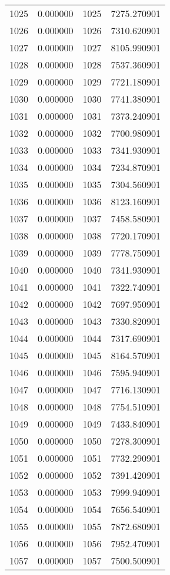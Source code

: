 \documentclass[12pt]{article}
\begin{document}
\begin{longtable}{@{}cccc@{}}
1025 & 0.000000 & 1025 & 7275.270901 \\
1026 & 0.000000 & 1026 & 7310.620901 \\
1027 & 0.000000 & 1027 & 8105.990901 \\
1028 & 0.000000 & 1028 & 7537.360901 \\
1029 & 0.000000 & 1029 & 7721.180901 \\
1030 & 0.000000 & 1030 & 7741.380901 \\
1031 & 0.000000 & 1031 & 7373.240901 \\
1032 & 0.000000 & 1032 & 7700.980901 \\
1033 & 0.000000 & 1033 & 7341.930901 \\
1034 & 0.000000 & 1034 & 7234.870901 \\
1035 & 0.000000 & 1035 & 7304.560901 \\
1036 & 0.000000 & 1036 & 8123.160901 \\
1037 & 0.000000 & 1037 & 7458.580901 \\
1038 & 0.000000 & 1038 & 7720.170901 \\
1039 & 0.000000 & 1039 & 7778.750901 \\
1040 & 0.000000 & 1040 & 7341.930901 \\
1041 & 0.000000 & 1041 & 7322.740901 \\
1042 & 0.000000 & 1042 & 7697.950901 \\
1043 & 0.000000 & 1043 & 7330.820901 \\
1044 & 0.000000 & 1044 & 7317.690901 \\
1045 & 0.000000 & 1045 & 8164.570901 \\
1046 & 0.000000 & 1046 & 7595.940901 \\
1047 & 0.000000 & 1047 & 7716.130901 \\
1048 & 0.000000 & 1048 & 7754.510901 \\
1049 & 0.000000 & 1049 & 7433.840901 \\
1050 & 0.000000 & 1050 & 7278.300901 \\
1051 & 0.000000 & 1051 & 7732.290901 \\
1052 & 0.000000 & 1052 & 7391.420901 \\
1053 & 0.000000 & 1053 & 7999.940901 \\
1054 & 0.000000 & 1054 & 7656.540901 \\
1055 & 0.000000 & 1055 & 7872.680901 \\
1056 & 0.000000 & 1056 & 7952.470901 \\
1057 & 0.000000 & 1057 & 7500.500901 \\

\end{longtable}
\end{document}
